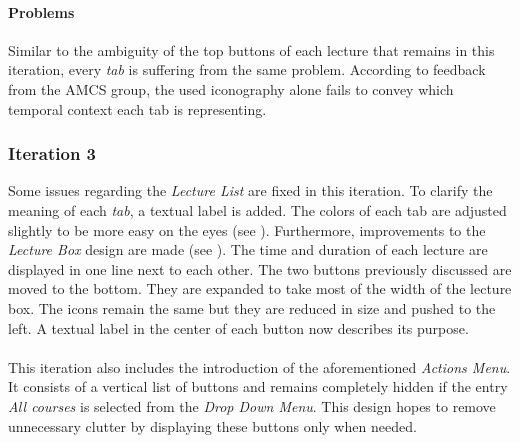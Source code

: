 \paragraph{Problems}
Similar to the ambiguity of the top buttons of each lecture that remains in this iteration, every \emph{tab} is suffering from the same problem. According to feedback from the AMCS group, the used iconography alone fails to convey which temporal context each tab is representing.

\subsubsection{Iteration 3}
Some issues regarding the \emph{Lecture List} are fixed in this iteration.
To clarify the meaning of each \emph{tab}, a textual label is added. 
The colors of each tab are adjusted slightly to be more easy on the eyes (see ). Furthermore, improvements to the \emph{Lecture Box} design are made (see ). The time and duration of each lecture are displayed in one line next to each other. The two buttons previously discussed are moved to the bottom. They are expanded to take most of the width of the lecture box. The icons remain the same but they are reduced in size and pushed to the left.
A textual label in the center of each button now describes its purpose.
\\
\\
This iteration also includes the introduction of the aforementioned \emph{Actions Menu}. It consists of a vertical list of buttons and remains completely hidden if the entry \emph{All courses} is selected from the \emph{Drop Down Menu}. This design hopes to remove unnecessary clutter by displaying these buttons only when needed.

